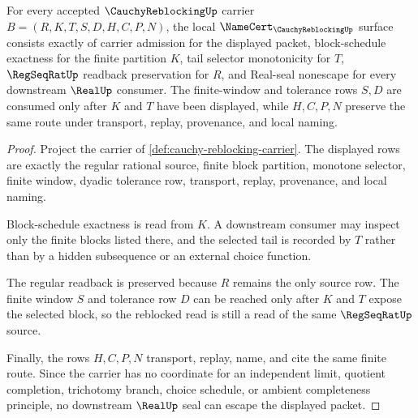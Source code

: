 \begin{theorem}
\label{thm:cauchy-reblocking-namecert-obligations}
For every accepted $\CauchyReblockingUp$ carrier $B=(R,K,T,S,D,H,C,P,N)$, the local $\NameCert_{\CauchyReblockingUp}$ surface consists exactly of carrier admission for the displayed packet, block-schedule exactness for the finite partition $K$, tail selector monotonicity for $T$, $\RegSeqRatUp$ readback preservation for $R$, and Real-seal nonescape for every downstream $\RealUp$ consumer. The finite-window and tolerance rows $S,D$ are consumed only after $K$ and $T$ have been displayed, while $H,C,P,N$ preserve the same route under transport, replay, provenance, and local naming.
\end{theorem}
\begin{proof}
Project the carrier of \autoref{def:cauchy-reblocking-carrier}. The displayed rows are exactly the regular rational source, finite block partition, monotone selector, finite window, dyadic tolerance row, transport, replay, provenance, and local naming.

Block-schedule exactness is read from $K$. A downstream consumer may inspect only the finite blocks listed there, and the selected tail is recorded by $T$ rather than by a hidden subsequence or an external choice function.

The regular readback is preserved because $R$ remains the only source row. The finite window $S$ and tolerance row $D$ can be reached only after $K$ and $T$ expose the selected block, so the reblocked read is still a read of the same $\RegSeqRatUp$ source.

Finally, the rows $H,C,P,N$ transport, replay, name, and cite the same finite route. Since the carrier has no coordinate for an independent limit, quotient completion, trichotomy branch, choice schedule, or ambient completeness principle, no downstream $\RealUp$ seal can escape the displayed packet.
\end{proof}

